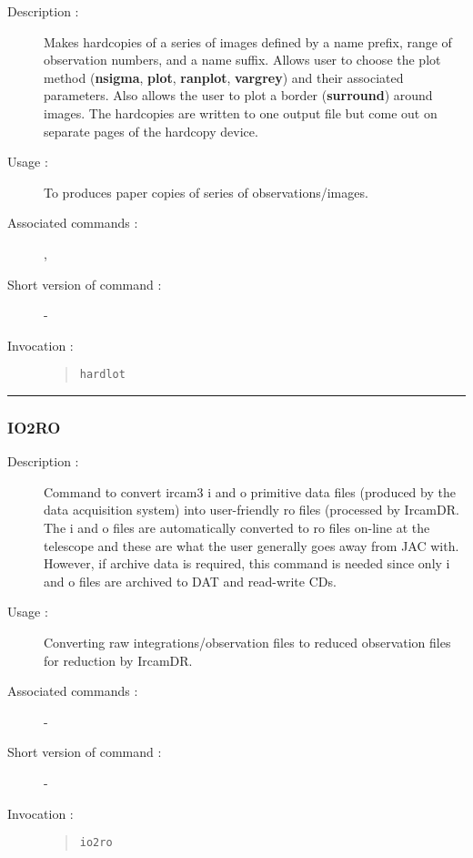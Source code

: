 \begin{description}

\item[Description :] Makes hardcopies of a series of images defined by
a name prefix, range of observation numbers, and a name suffix.  Allows
user to choose the plot method ({\bf nsigma}, {\bf plot}, {\bf
ranplot}, {\bf vargrey}) and their associated parameters.  Also allows
the user to plot a border ({\bf surround}) around images.  The
hardcopies are written to one output file but come out on separate
pages of the hardcopy device.

\item[Usage :] To produces paper copies of series of observations/images.
\item[Associated commands :] {\tt {}}, 
{\tt {}}
\item[Short version of command :] -
\item[Invocation :]

\begin{quote}{\tt  hardlot }\end{quote}

\end{description}

\hrule 
\subsubsection*{\label{IO2RO}IO2RO}

\begin{description}

\item[Description :] Command to convert {\sc ircam3} {\sc i} and {\sc
o} primitive data files (produced by the data acquisition system) into
user-friendly {\sc ro} files (processed by {\sc IrcamDR}.  The {\sc i}
and {\sc o} files are automatically converted to {\sc ro} files on-line
at the telescope and these are what the user generally goes away from
JAC with.  However, if archive data is required, this command is needed
since only {\sc i} and {\sc o} files are archived to DAT and read-write
CDs.

\item[Usage :] Converting raw integrations/observation files to reduced
observation files for reduction by {\sc IrcamDR}.
\item[Associated commands :] -
\item[Short version of command :] -
\item[Invocation :]

\begin{quote}{\tt  io2ro }\end{quote}

\end{description}

